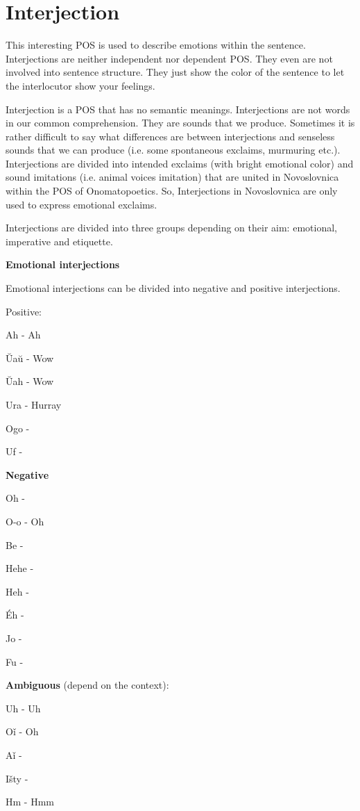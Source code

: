 \section{Interjection}

This interesting POS is used to describe emotions within the sentence. Interjections are neither independent nor dependent POS. They even are not involved into sentence structure. They just show the color of the sentence to let the interlocutor show your feelings. 

Interjection is a POS that has no semantic meanings. Interjections are not words in our common comprehension. They are sounds that we produce. Sometimes it is rather difficult to say what differences are between interjections and senseless sounds that we can produce (i.e. some spontaneous exclaims, murmuring etc.). Interjections are divided into intended exclaims (with bright emotional color) and sound imitations (i.e. animal voices imitation) that are united in Novoslovnica within the POS of Onomatopoetics. So, Interjections in Novoslovnica are only used to express emotional exclaims.

Interjections are divided into three groups depending on their aim: emotional, imperative and etiquette. 

\textbf{Emotional interjections}

Emotional interjections can be divided into negative and positive interjections.

Positive:

Ah - Ah

Ŭaŭ - Wow

Ŭah - Wow

Ura - Hurray

Ogo - 

Uf - 

\textbf{Negative}

Oh - 

O-o - Oh

Be - 

Hehe -

Heh -  

Éh - 

Jo - 

Fu - 

\textbf{Ambiguous} (depend on the context):

Uh - Uh

Oǐ - Oh

Aǐ - 

Išty - 

Hm - Hmm

